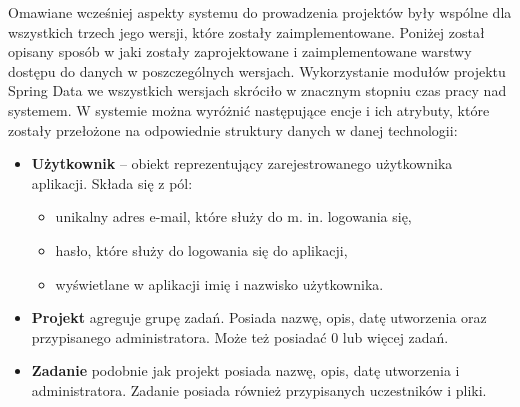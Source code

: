 Omawiane wcześniej aspekty systemu do prowadzenia projektów były wspólne dla wszystkich trzech jego wersji, które zostały zaimplementowane.
Poniżej został opisany sposób w jaki zostały zaprojektowane i zaimplementowane warstwy dostępu do danych w poszczególnych wersjach.
Wykorzystanie modułów projektu Spring Data we wszystkich wersjach skróciło w znacznym stopniu czas pracy nad systemem.
W systemie można wyróżnić następujące encje i ich atrybuty, które zostały przełożone na odpowiednie struktury danych w danej technologii:
\begin{itemize}
    \item \textbf{Użytkownik} -- obiekt reprezentujący zarejestrowanego użytkownika aplikacji. 
    Składa się z pól:
    \begin{itemize}
        \item unikalny adres e-mail, które służy do m. in. logowania się,
        \item hasło, które służy do logowania się do aplikacji,
        \item wyświetlane w aplikacji imię i nazwisko użytkownika.
    \end{itemize}
    
    \item \textbf{Projekt} agreguje grupę zadań.
    Posiada nazwę, opis, datę utworzenia oraz przypisanego administratora.
    Może też posiadać 0 lub więcej zadań.
    
    \item \textbf{Zadanie} podobnie jak projekt posiada nazwę, opis, datę utworzenia i administratora.
    Zadanie posiada również przypisanych uczestników i pliki.
    
    

\end{itemize}
